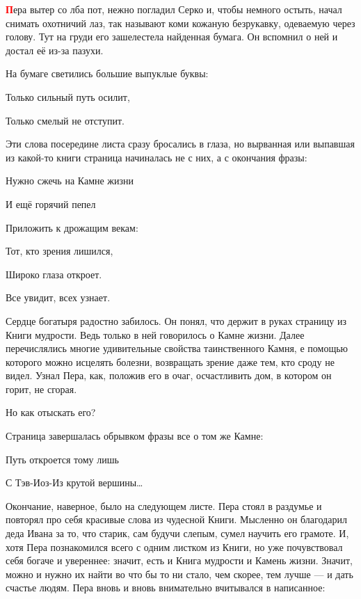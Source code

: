 \documentclass[oneside,final,14pt]{extreport}
\begin{document}
	
	\lettrine[findent=0pt]{\textbf{\textcolor{red}{П}}}{}ера вытер со лба пот, нежно погладил Серко и, чтобы немного остыть, начал снимать охотничий лаз, так называют коми кожаную безрукавку, одеваемую через голову. Тут на груди его зашелестела найденная бумага. Он вспомнил о ней и достал её из-за пазухи.
	
	На бумаге светились большие выпуклые буквы:
	
	
	
	
\qquad \qquad \qquad \qquad 	Только сильный путь осилит,

\qquad \qquad \qquad \qquad 	Только смелый не отступит.
	
	
	
	
	Эти слова посередине листа сразу бросались в глаза, но вырванная или выпавшая из какой-то книги страница начиналась не с них, а с окончания фразы:
	
	
	
	
\qquad \qquad \qquad \qquad 	Нужно сжечь на Камне жизни
	
\qquad \qquad \qquad \qquad 	И ещё горячий пепел
	
\qquad \qquad \qquad \qquad 	Приложить к дрожащим векам:
	
\qquad \qquad \qquad \qquad 	Тот, кто зрения лишился,
	
\qquad \qquad \qquad \qquad 	Широко глаза откроет.
	
\qquad \qquad \qquad \qquad 	Все увидит, всех узнает.
	
	
	
	
	Сердце богатыря радостно забилось. Он понял, что держит в руках страницу из Книги мудрости. Ведь только в ней говорилось о Камне жизни. Далее перечислялись многие удивительные свойства таинственного Камня, е помощью которого можно исцелять болезни, возвращать зрение даже тем, кто сроду не видел. Узнал Пера, как, положив его в очаг, осчастливить дом, в котором он горит, не сгорая.
	
	Но как отыскать его?
	
	Страница завершалась обрывком фразы все о том же Камне:
	
	
	
	
\qquad \qquad \qquad \qquad 	Путь откроется тому лишь
	
\qquad \qquad \qquad \qquad 	С Тэв-Иоз-Из крутой вершины…
	
	
	
	
	Окончание, наверное, было на следующем листе. Пера стоял в раздумье и повторял про себя красивые слова из чудесной Книги. Мысленно он благодарил деда Ивана за то, что старик, сам будучи слепым, сумел научить его грамоте. И, хотя Пера познакомился всего с одним листком из Книги, но уже почувствовал себя богаче и увереннее: значит, есть и Книга мудрости и Камень жизни. Значит, можно и нужно их найти во что бы то ни стало, чем скорее, тем лучше — и дать счастье людям. Пера вновь и вновь внимательно вчитывался в написанное:
	
\end{document}
